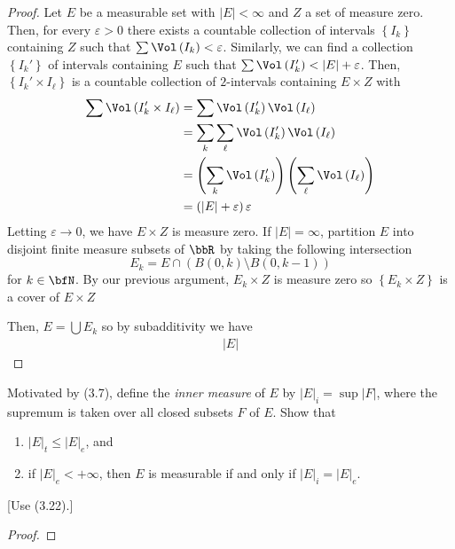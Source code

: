 \begin{proof}
Let $E$ be a measurable set with $\left|E\right|<\infty$ and $Z$ a set of
measure zero. Then, for every $\varepsilon>0$ there exists a countable
collection of intervals $\left\{I_k\right\}$ containing $Z$ such that
$\sum\Vol\left(I_k\right)<\varepsilon$. Similarly, we can find a collection
$\left\{I_k'\right\}$ of intervals containing $E$ such that
$\sum\Vol\left(I_k'\right)<\left|E\right|+\varepsilon$. Then,
$\left\{I_k'\times I_\ell\right\}$ is a countable collection of
$2$-intervals containing $E\times Z$ with
\begin{align*}
\sum\Vol\left(I_k'\times I_\ell\right)
&=\sum\Vol\left(I_k'\right)\Vol\left(I_\ell\right)\\
&=\sum_k\sum_\ell\Vol\left(I_k'\right)\Vol\left(I_\ell\right)\\
&=\left(\sum_k\Vol\left(I_k'\right)\right)
\left(\sum_\ell\Vol\left(I_\ell\right)\right)\\
&=\left(\left|E\right|+\varepsilon\right)\varepsilon
\end{align*}
Letting $\varepsilon\to 0$, we have $E\times Z$ is measure zero. If
$\left|E\right|=\infty$, partition $E$ into disjoint finite measure subsets
of $\bbR$ by taking the following intersection
\[
E_k=E\cap\left(B(0,k)\setminus B(0,k-1)\right)
\]
for $k\in\bfN$. By our previous argument, $E_k\times Z$ is measure zero so
$\left\{E_k\times Z\right\}$ is a cover of $E\times Z$

Then, $E=\bigcup E_k$ so by subadditivity we have
\begin{align*}
\left|E\right|
\end{align*}
\end{proof}
\newpage

\begin{problem}
Motivated by (3.7), define the \emph{inner measure} of $E$ by
$\left|E\right|_i=\sup\left|F\right|$, where the supremum is taken over all
closed subsets $F$ of $E$. Show that
\begin{enumerate}[label=(\roman*)]
\item $\left|E\right|_t\leq\left|E\right|_e$, and
\item if $\left|E\right|_e<+\infty$, then $E$ is measurable if and only if
  $\left|E\right|_i=\left|E\right|_e$.
\end{enumerate}
[Use (3.22).]
\end{problem}
\begin{proof}
\end{proof}
\newpage

